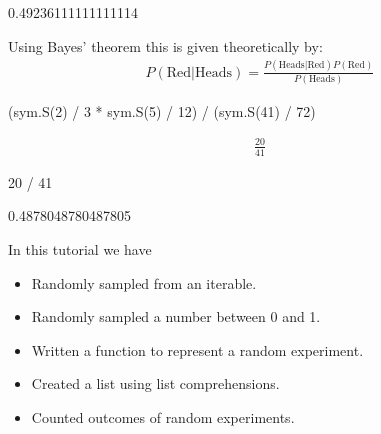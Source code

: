 \begin{raw}
0.49236111111111114
\end{raw}






Using Bayes’ theorem this is given theoretically by:
\begin{equation*}
\begin{split}
    P(\text{Red}|\text{Heads}) = \frac{P(\text{Heads} | \text{Red})P(\text{Red})}{P(\text{Heads})}
\end{split}
\end{equation*}



\begin{pyin}
(sym.S(2) / 3 * sym.S(5) / 12) / (sym.S(41) / 72)
\end{pyin}




\begin{equation*}
\begin{split}\displaystyle \frac{20}{41}\end{split}
\end{equation*}







\begin{pyin}
20 / 41
\end{pyin}





\begin{raw}
0.4878048780487805
\end{raw}







\begin{note}
In this tutorial we have
\begin{itemize}
\item 

Randomly sampled from an iterable.

\item 

Randomly sampled a number between 0 and 1.

\item 

Written a function to represent a random experiment.

\item 

Created a list using list comprehensions.

\item 

Counted outcomes of random experiments.

\end{itemize}
\end{note}





